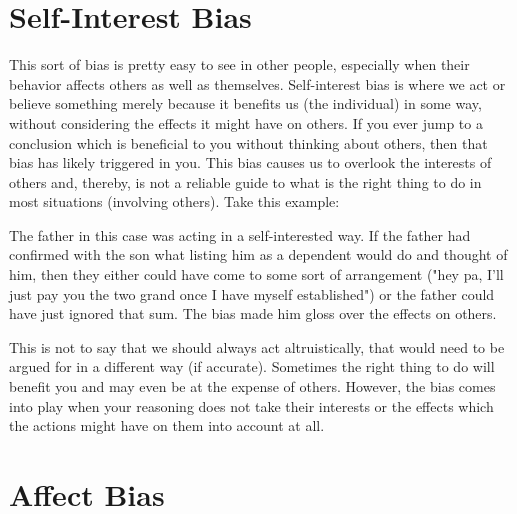\section{Self-Interest Bias}

This sort of bias is pretty easy to see in other people, especially when their behavior affects others as well as themselves. Self-interest bias is where we act or believe something merely because it benefits us (the individual) in some way, without considering the effects it might have on others. If you ever jump to a conclusion which is beneficial to you without thinking about others, then that bias has likely triggered in you. This bias causes us to overlook the interests of others and, thereby, is not a reliable guide to what is the right thing to do in most situations (involving others). Take this example:


The father in this case was acting in a self-interested way. If the father had confirmed with the son what listing him as a dependent would do and thought of him, then they either could have come to some sort of arrangement ("hey pa, I'll just pay you the two grand once I have myself established") or the father could have just ignored that sum. The bias made him gloss over the effects on others.

This is not to say that we should always act altruistically, that would need to be argued for in a different way (if accurate). Sometimes the right thing to do will benefit you and may even be at the expense of others. However, the bias comes into play when your reasoning does not take their interests or the effects which the actions might have on them into account at all. 

\section{Affect Bias}


